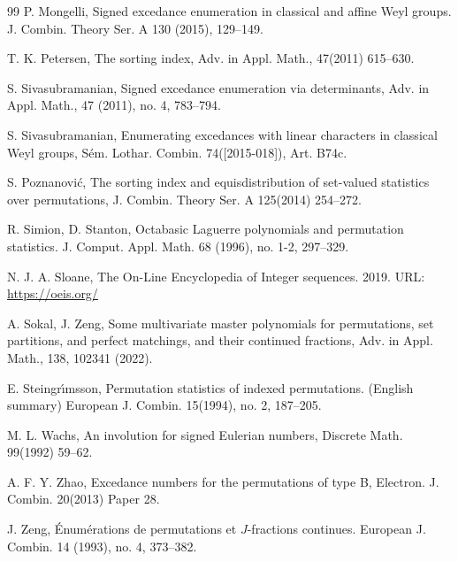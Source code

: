 \documentclass[12pt,reqno]{amsart}
\numberwithin{equation}{section}
\newcounter{num}
\begin{document}
\begin{thebibliography}{99}
P. Mongelli,  Signed excedance enumeration in classical and affine Weyl groups. J. Combin. Theory Ser. A 130 (2015), 129--149.

T. K. Petersen,  
The sorting index,
Adv. in Appl. Math., 47(2011) 615--630.

%
S. Sivasubramanian,  
Signed excedance enumeration via determinants,
Adv. in Appl. Math., 47 (2011), no. 4, 783--794.


S. Sivasubramanian,  
Enumerating excedances with linear characters in classical Weyl groups,
S\'em. Lothar. Combin. 74([2015-018]), Art. B74c.


S. Poznanovi\'c,
The sorting index and equisdistribution of set-valued statistics over permutations,
J. Combin. Theory Ser. A 125(2014) 254--272.

R. Simion, D. Stanton, 
Octabasic Laguerre polynomials and permutation statistics. 
J. Comput. Appl. Math. 68 (1996), no. 1-2, 297--329.

N. J. A. Sloane,
The On-Line Encyclopedia of Integer sequences. 2019. URL: \url{https://oeis.org/}

A. Sokal, J. Zeng,
Some multivariate master polynomials for permutations, set partitions, and perfect matchings, and their continued fractions,
Adv. in Appl. Math., 138, 102341 (2022).

E. Steingr\'{\i}msson, 
Permutation statistics of indexed permutations. (English summary)
European J. Combin. 15(1994), no. 2, 187--205.

M. L. Wachs, 
An involution for signed Eulerian numbers, 
Discrete Math. 99(1992) 59--62.

A. F. Y. Zhao,  
Excedance numbers for the permutations of type B,
Electron. J. Combin. 20(2013) Paper 28. 

J. Zeng,  
{\'{E}num\'{e}rations de permutations et {$J$}-fractions continues}. 
European J. Combin. 14 (1993), no. 4, 373--382.
\end{thebibliography}
\end{document}
